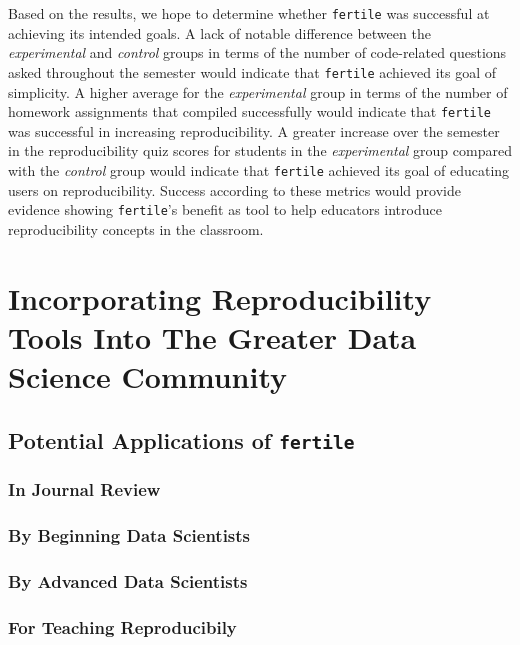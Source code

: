 \documentclass[12pt,twoside]{reedthesis}
\begin{document}
Based on the results, we hope to determine whether \texttt{fertile} was
successful at achieving its intended goals. A lack of notable difference
between the \emph{experimental} and \emph{control} groups in terms of
the number of code-related questions asked throughout the semester would
indicate that \texttt{fertile} achieved its goal of simplicity. A higher
average for the \emph{experimental} group in terms of the number of
homework assignments that compiled successfully would indicate that
\texttt{fertile} was successful in increasing reproducibility. A greater
increase over the semester in the reproducibility quiz scores for
students in the \emph{experimental} group compared with the
\emph{control} group would indicate that \texttt{fertile} achieved its
goal of educating users on reproducibility. Success according to these
metrics would provide evidence showing \texttt{fertile}'s benefit as
tool to help educators introduce reproducibility concepts in the
classroom.

\chapter{Incorporating Reproducibility Tools Into The Greater Data
Science Community}\label{applications}

\section{\texorpdfstring{Potential Applications of
\texttt{fertile}}{Potential Applications of fertile}}\label{potential-applications-of-fertile}

\subsection{In Journal Review}\label{in-journal-review}

\subsection{By Beginning Data
Scientists}\label{by-beginning-data-scientists}

\subsection{By Advanced Data
Scientists}\label{by-advanced-data-scientists}

\subsection{For Teaching
Reproducibily}\label{for-teaching-reproducibily}
\end{document}

